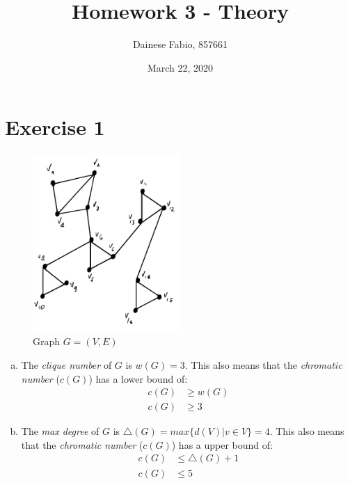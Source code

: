 \documentclass{article}
\title{Homework 3 - Theory}
\author{Dainese Fabio, 857661}
\date{March 22, 2020}
\begin{document}
\maketitle

\section{Exercise 1}
    \begin{figure}[H]
        \centering
        \includegraphics[width=0.5\textwidth]{1.png}
        \caption{Graph \(G=(V,E)\)}
        \label{fig:figure-1}
    \end{figure}
    
    \begin{enumerate}[a)] 
        \item The \textit{clique number} of \(G\) is \(w(G) = 3\). This also means that the \textit{chromatic number} (\(c(G)\)) has a lower bound of:
        \begin{align*}
            c(G) &\geq w(G) \\
            c(G) &\geq 3
        \end{align*}
        
        \item The \textit{max degree} of \(G\) is \(\triangle(G) = max\{d(V) | v \in V\} = 4\). This also means that the \textit{chromatic number} (\(c(G)\)) has a upper bound of:
        \begin{align*}
            c(G) &\leq \triangle(G)+1 \\
            c(G) &\leq 5
        \end{align*}
    \end{enumerate}
    
\end{document}
